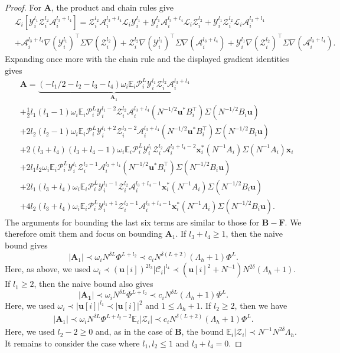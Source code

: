 \documentclass[11pt,reqno]{amsart}
\def\u{\mathbf{u}}
\def\x{\mathbf{x}}
\def\E{\mathbb{E}}
\def\cA{\mathcal{A}}
\def\cY{\mathcal{Y}}
\def\cZ{\mathcal{Z}}
\def\cP{\mathcal{P}}
\def\cC{\mathcal{C}}
\def\cL{\mathcal{L}}
\theoremstyle{definition}
\numberwithin{equation}{section}
\numberwithin{figure}{section}
\begin{document}
\begin{proof}
For $\mathbf{A}$, the product and chain rules give
\begin{align*}
    &\cL_i[\cY_i^{l_1}\cZ_i^{l_2}\cA_i^{l_3+l_4}]=\cZ_i^{l_2}\cA_i^{l_3+l_4}\cL_i\cY_i^{l_1}+\cY_i^{l_1}\cA_i^{l_3+l_4}\cL_i\cZ_i^{l_2}+\cY_i^{l_1}\cZ_i^{l_2}\cL_i\cA_i^{l_3+l_4}\\
    &+\cA_i^{l_3+l_4}\nabla(\cY_i^{l_1})^\top\Sigma\nabla(\cZ_i^{l_2})+\cZ_i^{l_2}\nabla(\cY_i^{l_1})^\top\Sigma\nabla(\cA_i^{l_3+l_4})+\cY_i^{l_1}\nabla(\cZ_i^{l_2})^\top\Sigma\nabla(\cA_i^{l_3+l_4}).
\end{align*}
Expanding once more with the chain rule and the displayed gradient identities gives
\begin{align*}
    &\mathbf{A}=\underbrace{(-l_1/2-l_2-l_3-l_4)\omega_i\E_i\cP_i^L\cY_i^{l_1}\cZ_i^{l_2}\cA_i^{l_3+l_4}}_{\mathbf{A}_1}\\
    &+\frac12l_1(l_1-1)\omega_i\E_i\cP_i^L\cY_i^{l_1-2}\cZ_i^{l_2}\cA_i^{l_3+l_4}(N^{-1/2}\u^*B_i^\top)\Sigma(N^{-1/2}B_i\u)\\
    &+2l_2(l_2-1)\omega_i\E_i\cP_i^L\cY_i^{l_1+2}\cZ_i^{l_2-2}\cA_i^{l_3+l_4}(N^{-1/2}\u^*B_i^\top)\Sigma(N^{-1/2}B_i\u)\\
    &+2(l_3+l_4)(l_3+l_4-1)\omega_i\E_i\cP_i^L\cY_i^{l_1}\cZ_i^{l_2}\cA_i^{l_3+l_4-2}\x_i^*(N^{-1}A_i)\Sigma(N^{-1}A_i)\x_i\\
    &+2l_1l_2\omega_i\E_i\cP_i^L\cY_i^{l_1}\cZ_i^{l_2-1}\cA_i^{l_3+l_4}(N^{-1/2}\u^*B_i^\top)\Sigma(N^{-1/2}B_i\u)\\
    &+2l_1(l_3+l_4)\omega_i\E_i\cP_i^L\cY_i^{l_1-1}\cZ_i^{l_2}\cA_i^{l_3+l_4-1}\x_i^*(N^{-1}A_i)\Sigma(N^{-1/2}B_i\u)\\
    &+4l_2(l_3+l_4)\omega_i\E_i\cP_i^L\cY_i^{l_1+1}\cZ_i^{l_2-1}\cA_i^{l_3+l_4-1}\x_i^*(N^{-1}A_i)\Sigma(N^{-1/2}B_i\u).
\end{align*}
The arguments for bounding the last six terms are similar to those for $\mathbf{B}-\mathbf{F}$. We therefore omit them and focus on bounding $\mathbf{A}_1$. If $l_3+l_4\geq 1$, then the naive bound gives
\[
    |\mathbf{A}_1|\prec\omega_i N^{\delta L}\Phi^{L+l_2}\prec c_i N^{\delta (L+2)}(\Lambda_h+1)\Phi^L.
\]
Here, as above, we used $\omega_i\prec(\u[i])^{2l_3}|\cC_i|^{l_4}\prec(\u[i]^2+N^{-1})N^{2\delta}(\Lambda_h+1)$. If $l_1\geq 2$, then the naive bound also gives
\[
    |\mathbf{A_1}|\prec\omega_i N^{\delta L}\Phi^{L+l_2}\prec c_i N^{\delta L}(\Lambda_h+1)\Phi^L.
\]
Here, we used $\omega_i\prec|\u[i]|^{l_1}\prec|\u[i]|^2$ and $1\leq \Lambda_h+1$. If $l_2\geq 2$, then we have
\begin{align*}
    |\mathbf{A}_1|\prec\omega_i N^{\delta L}\Phi^{L+l_2-2}\E_i|\cZ_i|\prec c_i N^{\delta(L+2)}(\Lambda_h+1)\Phi^L.
\end{align*}
Here, we used $l_2-2\geq 0$ and, as in the case of $\mathbf{B}$, the bound $\E_i|\cZ_i|\prec N^{-1}N^{2\delta}\Lambda_h$. It remains to consider the case where $l_1,l_2\leq 1$ and $l_3+l_4=0$.


\end{proof}
\end{document}
